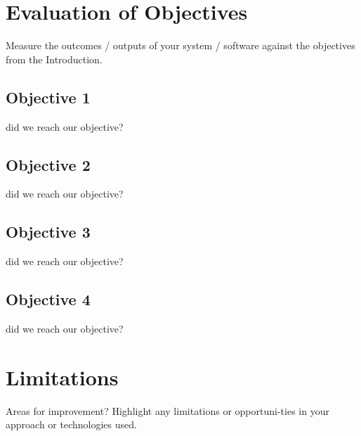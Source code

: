 \section{Evaluation of Objectives}
Measure the outcomes / outputs of your system / software against the objectives from the Introduction.
\subsection{Objective 1}
did we reach our objective?

\subsection{Objective 2}
did we reach our objective?

\subsection{Objective 3}
did we reach our objective?

\subsection{Objective 4}
did we reach our objective?

\section{Limitations}
Areas for improvement?
Highlight any limitations or opportuni-ties in your approach or technologies used.